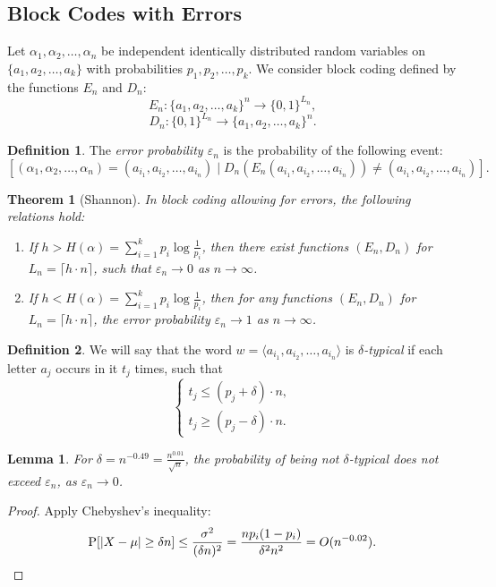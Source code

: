 \documentclass[12pt,sans]{article}
\newcommand{\seqn}[2]{{#1}_1,{#1}_2,\dotsc,{#1}_{#2}}
\newcommand{\seqin}[3]{{#1}_{{#2}_1},{#1}_{{#2}_2},\dotsc,{#1}_{{#2}_{#3}}}
\theoremstyle{definition}
\newtheorem{definition}{Definition}[section]
\theoremstyle{plain}
\newtheorem{theorem}{Theorem}[section]
\newtheorem{lemma}{Lemma}[section]
\theoremstyle{remark}
\begin{document}
\subsection{Block Codes with Errors}
Let \(\seqn{\alpha}{n}\) be independent identically distributed random variables on \(\{\seqn{a}{k}\}\) with probabilities \(\seqn{p}{k}\). We consider block coding defined by the functions \(E_n\) and \(D_n\):
\[
E_n:\{\seqn{a}{k}\}^n \to \{0,1\}^{L_n},
\]
\[
D_n:\{0,1\}^{L_n} \to \{\seqn{a}{k}\}^n.
\]
\begin{definition}
    The \emph{error probability \(\varepsilon_n\)} is the probability of the following event:
    \[
    [(\seqn{\alpha}{n}) = (\seqin{a}{i}{n}) \mid D_n(E_n(\seqin{a}{i}{n}))\neq (\seqin{a}{i}{n})].
    \]
\end{definition}
\begin{theorem}[Shannon]\label{thm:blockcoding}
    In block coding allowing for errors, the following relations hold:
    \begin{enumerate}
        \item If \(h > H(\alpha) = \sum_{i=1}^{k} p_i \log \frac{1}{p_i}\), then there exist functions \((E_n, D_n)\) for \(L_n = \lceil h \cdot n \rceil\), such that \(\varepsilon_n \to 0\) as \(n \to \infty\).

        \item If \(h < H(\alpha) = \sum_{i=1}^{k} p_i \log \frac{1}{p_i}\), then for any functions \((E_n, D_n)\) for \(L_n = \lceil h \cdot n \rceil\), the error probability \(\varepsilon_n \to 1\) as \(n \to \infty\).
    \end{enumerate}
\end{theorem}
\begin{definition}
    We will say that the word \(w = \langle\seqin{a}{i}{n}\rangle\) is \emph{\(\delta\)-typical} if each letter \(a_j\) occurs in it \(t_j\) times, such that
    \[
    \begin{cases}
        t_j \le (p_j + \delta) \cdot n,\\
        t_j \ge (p_j - \delta) \cdot n.
    \end{cases}
    \]
\end{definition}
\begin{lemma}\label{lm:typicalwordprob}
    For \(\delta = n^{-0.49} = \frac{n^{0.01}}{\sqrt{n}}\), the probability of being not \(\delta\)-typical does not exceed \(\varepsilon_n\), as \(\varepsilon_n \to 0\).
\end{lemma}
\begin{proof}
    Apply Chebyshev's inequality:
    \[
    \mathrm{P}[|X - \mu| \ge \delta n] \le \frac{\sigma^2}{(\delta n)^2} =
    \frac{np_i(1-p_i)}{\delta^2 n^2} = O(n^{-0.02}). \qedhere
    \]
\end{proof}
\end{document}
